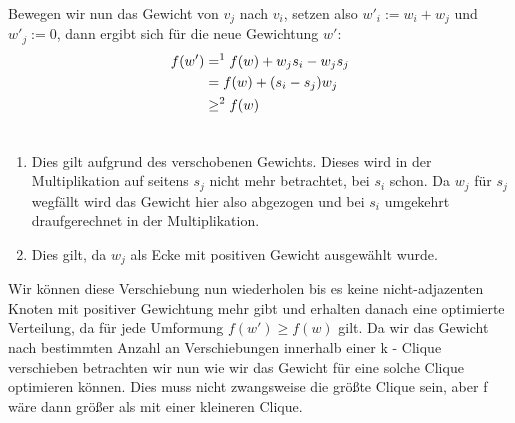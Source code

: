 \documentclass[12pt, a4paper]{article}
\begin{document}
Bewegen wir nun das Gewicht von $v_j$ nach $v_i$, setzen also $w'_i := w_i + w_j$ und $w'_j := 0$, dann ergibt sich für die neue Gewichtung $w'$:
\begin{gather}
\begin{split}f(w') &=^1 f(w) + w_j s_i - w_j s_j \\
&= f(w) + (s_i - s_j) w_j \\
&\ge^2 f(w)\end{split}\notag\\\begin{split}\end{split}\notag
\end{gather}\begin{enumerate}
\item {}
Dies gilt aufgrund des verschobenen Gewichts. Dieses wird in der Multiplikation auf seitens $s_j$ nicht mehr betrachtet, bei $s_i$ schon. Da $w_j$ für $s_j$ wegfällt wird das Gewicht hier also abgezogen und bei $s_i$ umgekehrt draufgerechnet in der Multiplikation.

\item {}
Dies gilt, da $w_j$ als Ecke mit positiven Gewicht ausgewählt wurde.

\end{enumerate}

Wir können diese Verschiebung nun wiederholen bis es keine nicht-adjazenten Knoten mit positiver Gewichtung mehr gibt und erhalten danach eine optimierte Verteilung, da für jede Umformung $f(w') \ge f(w)$ gilt. Da wir das Gewicht nach bestimmten Anzahl an Verschiebungen innerhalb einer k - Clique verschieben betrachten wir nun wie wir das Gewicht für eine solche Clique optimieren können.
Dies muss nicht zwangsweise die größte Clique sein, aber f wäre dann größer als mit einer kleineren Clique.
\end{document}
